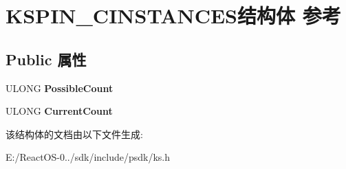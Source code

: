 \hypertarget{struct_k_s_p_i_n___c_i_n_s_t_a_n_c_e_s}{}\section{K\+S\+P\+I\+N\+\_\+\+C\+I\+N\+S\+T\+A\+N\+C\+E\+S结构体 参考}
\label{struct_k_s_p_i_n___c_i_n_s_t_a_n_c_e_s}
\subsection*{Public 属性}
\begin{DoxyCompactItemize}
\item 
\mbox{\label{struct_k_s_p_i_n___c_i_n_s_t_a_n_c_e_s_ad520ef055d9c8a1cf8ea529c64e8e2a2}} 
U\+L\+O\+NG {\bfseries Possible\+Count}
\item 
\mbox{\label{struct_k_s_p_i_n___c_i_n_s_t_a_n_c_e_s_a28f1c626e0e333984d485d83822c1853}} 
U\+L\+O\+NG {\bfseries Current\+Count}
\end{DoxyCompactItemize}


该结构体的文档由以下文件生成\+:\begin{DoxyCompactItemize}
\item 
E\+:/\+React\+O\+S-\/0../sdk/include/psdk/ks.\+h\end{DoxyCompactItemize}
